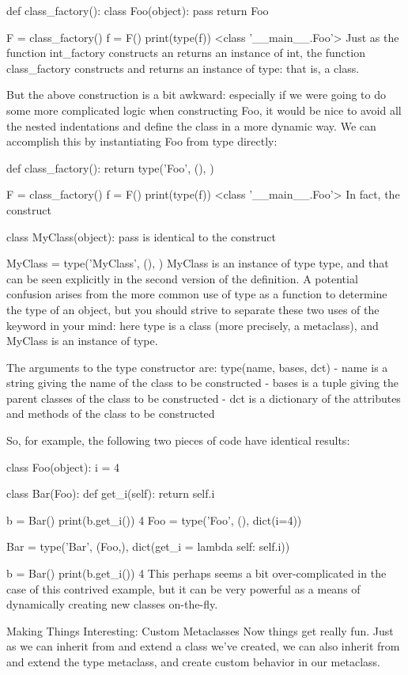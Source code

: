 def class_factory():
    class Foo(object):
        pass
    return Foo

F = class_factory()
f = F()
print(type(f))
<class '__main__.Foo'>
Just as the function int_factory constructs an returns an instance of int, the function class_factory constructs and returns an instance of type: that is, a class.

But the above construction is a bit awkward: especially if we were going to do some more complicated logic when constructing Foo, it would be nice to avoid all the nested indentations and define the class in a more dynamic way. We can accomplish this by instantiating Foo from type directly:

def class_factory():
    return type('Foo', (), {})

F = class_factory()
f = F()
print(type(f))
<class '__main__.Foo'>
In fact, the construct

class MyClass(object):
    pass
is identical to the construct

MyClass = type('MyClass', (), {})
MyClass is an instance of type type, and that can be seen explicitly in the second version of the definition. A potential confusion arises from the more common use of type as a function to determine the type of an object, but you should strive to separate these two uses of the keyword in your mind: here type is a class (more precisely, a metaclass), and MyClass is an instance of type.

The arguments to the type constructor are: type(name, bases, dct) - name is a string giving the name of the class to be constructed - bases is a tuple giving the parent classes of the class to be constructed - dct is a dictionary of the attributes and methods of the class to be constructed

So, for example, the following two pieces of code have identical results:

class Foo(object):
    i = 4

class Bar(Foo):
    def get_i(self):
        return self.i

b = Bar()
print(b.get_i())
4
Foo = type('Foo', (), dict(i=4))

Bar = type('Bar', (Foo,), dict(get_i = lambda self: self.i))

b = Bar()
print(b.get_i())
4
This perhaps seems a bit over-complicated in the case of this contrived example, but it can be very powerful as a means of dynamically creating new classes on-the-fly.

Making Things Interesting: Custom Metaclasses
Now things get really fun. Just as we can inherit from and extend a class we've created, we can also inherit from and extend the type metaclass, and create custom behavior in our metaclass.

